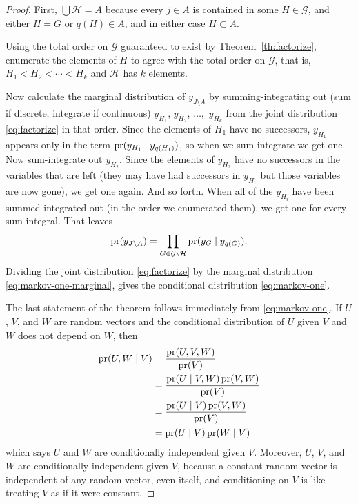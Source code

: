 \begin{proof}
First, $\bigcup \mathcal{H} = A$ because every $j \in A$ is contained in
some $H \in \mathcal{G}$, and either $H = G$ or $q(H) \in A$, and in either
case $H \subset A$.

Using the total order on $\mathcal{G}$ guaranteed to exist
by Theorem~\ref{th:factorize}, enumerate the elements of $H$
to agree with the total order on $\mathcal{G}$, that is,
$H_1 < H_2 < \cdots < H_k$ and $\mathcal{H}$ has $k$ elements.

Now calculate the marginal distribution of $y_{J \setminus A}$ by
summing-integrating out (sum if discrete, integrate if continuous)
$y_{H_1}$, $y_{H_2}$, $\ldots,$ $y_{H_k}$
from the joint distribution \eqref{eq:factorize} in that order.
Since the elements of $H_1$ have no successors, $y_{H_1}$ appears only in
the term $\operatorname{pr}(y_{H_1} \mid y_{q(H_1)})$, so when we sum-integrate we get one.
Now sum-integrate out $y_{H_2}$.  Since the elements of $y_{H_2}$ have no
successors in the variables that are left (they may have had successors in
$y_{H_1}$ but those variables are now gone), we get one again.  And so forth.
When all of the $y_{H_i}$ have been summed-integrated out (in the order we
enumerated them), we get one for every sum-integral.  That leaves
\begin{equation} \label{eq:markov-one-marginal}
   \operatorname{pr}(y_{J \setminus A})
   =
   \prod_{G \in \mathcal{G} \setminus \mathcal{H}} \operatorname{pr}(y_G \mid y_{q(G)}).
\end{equation}
Dividing the joint distribution \eqref{eq:factorize} by the marginal
distribution \eqref{eq:markov-one-marginal}, gives
the conditional distribution \eqref{eq:markov-one}.

The last statement of the theorem follows immediately from
\eqref{eq:markov-one}.  If $U$, $V$, and $W$ are random vectors
and the conditional distribution of $U$ given $V$ and $W$ does not depend
on $W$, then
\begin{align*}
   \operatorname{pr}(U, W \mid V)
   & =
   \frac{\operatorname{pr}(U, V, W)}{\operatorname{pr}(V)}
   \\
   & =
   \frac{\operatorname{pr}(U \mid V, W) \operatorname{pr}(V, W)}{\operatorname{pr}(V)}
   \\
   & =
   \frac{\operatorname{pr}(U \mid V) \operatorname{pr}(V, W)}{\operatorname{pr}(V)}
   \\
   & =
   \operatorname{pr}(U \mid V) \operatorname{pr}(W \mid V)
\end{align*}
which says $U$ and $W$ are conditionally independent given $V$.
Moreover, $U$, $V$, and $W$ are conditionally independent given $V$,
because a constant random vector is independent of any random vector,
even itself, and conditioning on $V$ is like treating $V$ as if it
were constant.
\end{proof}

